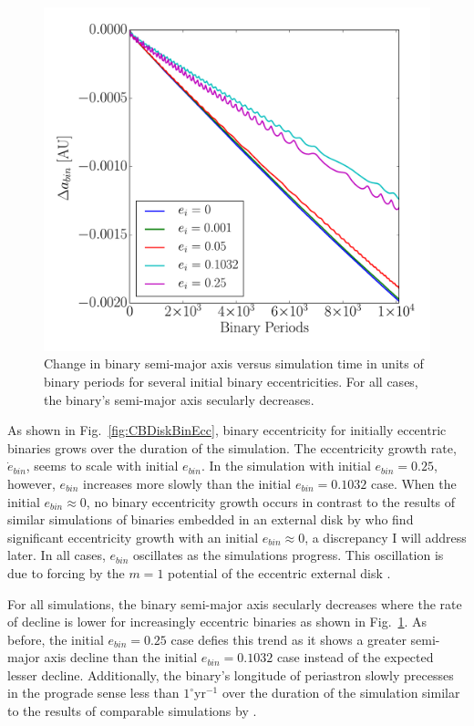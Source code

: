 \begin{figure}
	\includegraphics[width=\columnwidth]{f7}
    \caption{Change in binary semi-major axis versus simulation time in units of binary periods for several initial binary eccentricities. For all cases, the binary's semi-major axis secularly decreases.}
    \label{fig:CBDiskBinSemi}
\end{figure}

As shown in Fig.~\ref{fig:CBDiskBinEcc}, binary eccentricity for
initially eccentric binaries grows over the duration
of the simulation.  The eccentricity growth rate, $\dot{e}_{bin}$,
seems to scale with initial $e_{bin}$.  In the simulation with initial
$e_{bin} = 0.25$, however, $e_{bin}$ increases more slowly than the
initial $e_{bin} = 0.1032$ case.  When the initial $e_{bin} \approx
0$, no binary eccentricity growth occurs in contrast to the results of
similar simulations of binaries embedded in an external disk by
\citet{Papaloizou2001,Pierens2007,Cuadra2009} who find significant
eccentricity growth with an initial $e_{bin} \approx 0$, a discrepancy
I will address later.  In all cases, $e_{bin}$ oscillates as the simulations progress.  This oscillation is due to forcing by the $m = 1$ potential of the eccentric 
external disk \citep{Artymowicz2000}.

For all simulations, the binary semi-major axis secularly decreases where the rate of decline is lower for increasingly eccentric binaries as shown in Fig.~\ref{fig:CBDiskBinSemi}.  As before, the initial $e_{bin} = 0.25$ case defies this trend as it shows a greater semi-major axis decline than the initial $e_{bin} = 0.1032$ case instead of the expected lesser decline.  Additionally, the binary's longitude of periastron slowly precesses in the prograde sense less than $1^{\circ}$yr$^{-1}$ over the duration of the simulation similar to the results of comparable simulations by \citet{Kley2015}.

